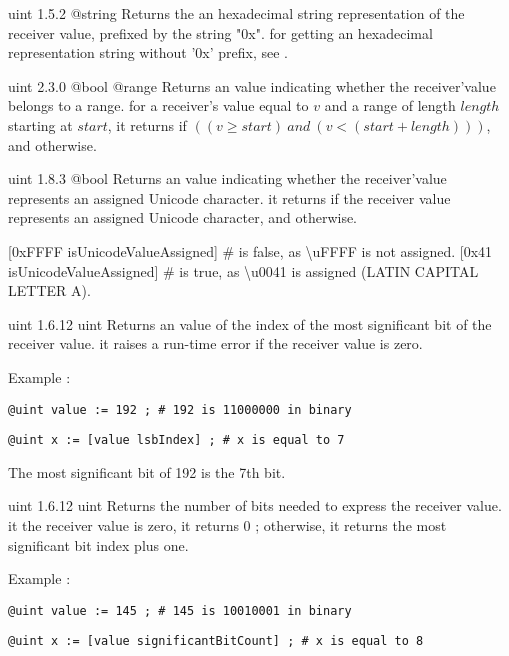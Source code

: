 {uint}
{1.5.2}
{@string}
{Returns the an hexadecimal string representation of the receiver value, prefixed by the string "0x".}
{for getting an hexadecimal representation string without '0x' prefix, see .}



{uint}
{2.3.0}
{@bool}
{@range}
{Returns an  value indicating whether the receiver'value belongs to a range.}
{for a receiver's value equal to $v$ and a range of length $length$ starting at $start$, it returns  if $((v \geqslant start)~and~(v<(start+length)))$, and  otherwise.}



{uint}
{1.8.3}
{@bool}
{Returns an  value indicating whether the receiver'value represents an assigned Unicode character.}
{it returns  if the receiver value represents an assigned Unicode character,  and otherwise.}

\exempleDeuxLignes
{}
{[0xFFFF isUnicodeValueAssigned] \# is false, as \textbackslash uFFFF is not assigned.}
{[0x41 isUnicodeValueAssigned] \# is true, as \textbackslash u0041 is assigned (LATIN CAPITAL LETTER A).}



{uint}
{1.6.12}
{uint}
{Returns an  value of the index of the most significant bit of the receiver value.}
{it raises a run-time error if the receiver value is zero.}

Example :

\texttt{@uint value := 192 ; \# 192 is 11000000 in binary}

\texttt{@uint x := [value lsbIndex] ; \# x is equal to 7}

The most significant bit of 192 is the 7th bit.




{uint}
{1.6.12}
{uint}
{Returns the number of bits needed to express the receiver value.}
{it the receiver value is zero, it returns 0 ; otherwise, it returns the most significant bit index plus one.}

Example :

\texttt{@uint value := 145 ; \# 145 is 10010001 in binary}

\texttt{@uint x := [value significantBitCount] ; \# x is equal to 8}





